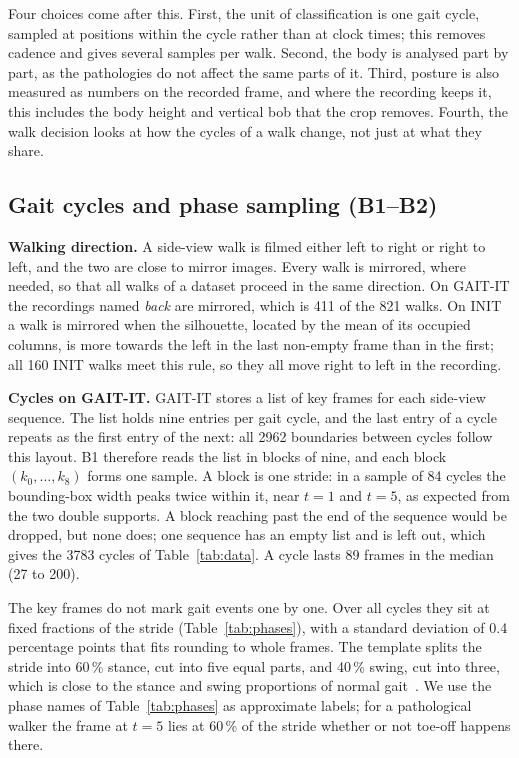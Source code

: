 \documentclass[conference]{IEEEtran}
\begin{document}
Four choices come after this. First, the unit of classification is one gait cycle, sampled at positions within the cycle rather than at clock times; this removes cadence and gives several samples per walk. Second, the body is analysed part by part, as the pathologies do not affect the same parts of it. Third, posture is also measured as numbers on the recorded frame, and where the recording keeps it, this includes the body height and vertical bob that the crop removes. Fourth, the walk decision looks at how the cycles of a walk change, not just at what they share.

\subsection{Gait cycles and phase sampling (B1--B2)}
\label{sec:cycles}

\textbf{Walking direction.} A side-view walk is filmed either left to right or right to left, and the two are close to mirror images. Every walk is mirrored, where needed, so that all walks of a dataset proceed in the same direction. On GAIT-IT the recordings named \emph{back} are mirrored, which is 411 of the 821 walks. On INIT a walk is mirrored when the silhouette, located by the mean of its occupied columns, is more towards the left in the last non-empty frame than in the first; all 160 INIT walks meet this rule, so they all move right to left in the recording.

\textbf{Cycles on GAIT-IT.} GAIT-IT stores a list of key frames for each side-view sequence. The list holds nine entries per gait cycle, and the last entry of a cycle repeats as the first entry of the next: all 2962 boundaries between cycles follow this layout. B1 therefore reads the list in blocks of nine, and each block $(k_0,\dots,k_8)$ forms one sample. A block is one stride: in a sample of 84 cycles the bounding-box width peaks twice within it, near $t=1$ and $t=5$, as expected from the two double supports. A block reaching past the end of the sequence would be dropped, but none does; one sequence has an empty list and is left out, which gives the 3783 cycles of Table~\ref{tab:data}. A cycle lasts 89 frames in the median (27 to 200).

The key frames do not mark gait events one by one. Over all cycles they sit at fixed fractions of the stride (Table~\ref{tab:phases}), with a standard deviation of 0.4 percentage points that fits rounding to whole frames. The template splits the stride into 60\,\% stance, cut into five equal parts, and 40\,\% swing, cut into three, which is close to the stance and swing proportions of normal gait~\cite{perry}. We use the phase names of Table~\ref{tab:phases} as approximate labels; for a pathological walker the frame at $t=5$ lies at 60\,\% of the stride whether or not toe-off happens there.
\end{document}
